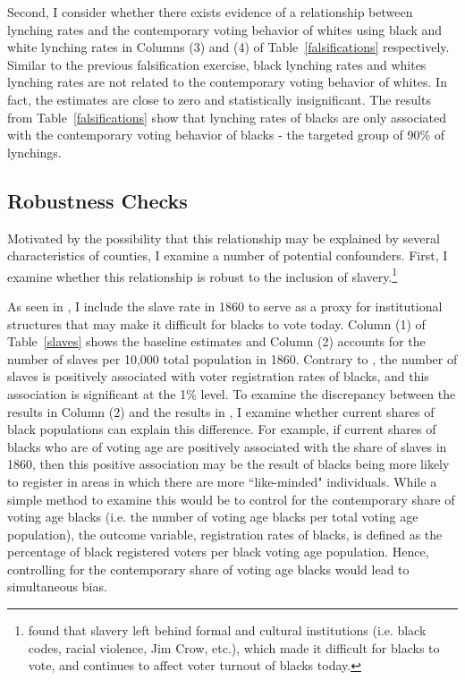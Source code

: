 \documentclass[AEJ, finalmode]{AEA}
\begin{document}
Second, I consider whether there exists evidence of a relationship between lynching rates and the contemporary voting behavior of whites using black and white lynching rates in Columns (3) and (4) of Table~\ref{falsifications} respectively. Similar to the previous falsification exercise, black lynching rates and whites lynching rates are not related to the contemporary voting behavior of whites. In fact, the estimates are close to zero and statistically insignificant. The results from Table~\ref{falsifications} show that lynching rates of blacks are only associated with the contemporary voting behavior of blacks - the targeted group of 90\% of lynchings. 

\subsection{Robustness Checks}

Motivated by the possibility that this relationship may be explained by several characteristics of counties, I examine a number of potential confounders. First, I examine whether this relationship is robust to the inclusion of slavery.\footnote{ found that slavery left behind formal and cultural institutions (i.e. black codes, racial violence, Jim Crow, etc.), which made it difficult for blacks to vote, and continues to affect voter turnout of blacks today.}

As seen in , I include the slave rate in 1860 \cite{ipumsnhgis} to serve as a proxy for institutional structures that may make it difficult for blacks to vote today. Column (1) of Table~\ref{slaves} shows the baseline estimates and Column (2) accounts for the number of slaves per 10,000 total population in 1860. Contrary to , the number of slaves is positively associated with voter registration rates of blacks, and this association is significant at the 1\% level. To examine the discrepancy between the results in Column (2) and the results in , I examine whether current shares of black populations can explain this difference. For example, if current shares of blacks who are of voting age are positively associated with the share of slaves in 1860, then this positive association may be the result of blacks being more likely to register in areas in which there are more ``like-minded" individuals. While a simple method to examine this would be to control for the contemporary share of voting age blacks (i.e. the number of voting age blacks per total voting age population), the outcome variable, registration rates of blacks, is defined as the percentage of black registered voters per black voting age population. Hence, controlling for the contemporary share of voting age blacks would lead to simultaneous bias. 
\end{document}
